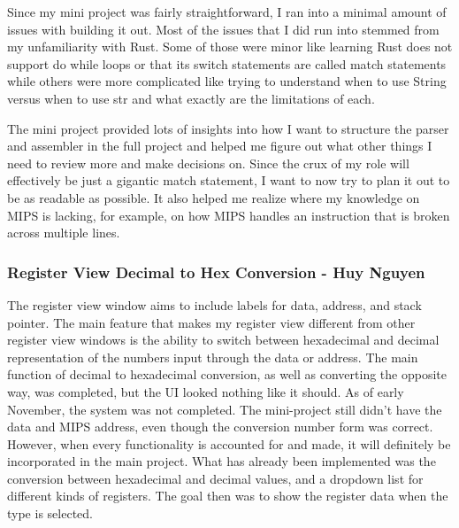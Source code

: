 \documentclass[
    paper=letter,
    parskip=half,
    fontsize=12pt,
    titlepage=firstiscover,
    toc=bibliography,
    numbers=endperiod
]{scrartcl}
\begin{document}
Since my mini project was fairly straightforward, I ran into a minimal
amount of issues with building it out. Most of the issues that I did run
into stemmed from my unfamiliarity with Rust. Some of those were minor
like learning Rust does not support do while loops or that its switch
statements are called match statements while others were more
complicated like trying to understand when to use String versus when to
use str and what exactly are the limitations of each.

The mini project provided lots of insights into how I want to structure
the parser and assembler in the full project and helped me figure out
what other things I need to review more and make decisions on. Since the
crux of my role will effectively be just a gigantic match statement, I
want to now try to plan it out to be as readable as possible. It also
helped me realize where my knowledge on MIPS is lacking, for example, on
how MIPS handles an instruction that is broken across multiple lines.

\subsubsection{Register View Decimal to Hex Conversion - Huy Nguyen}

The register view window aims to include labels for data, address, and
stack pointer. The main feature that makes my register view different
from other register view windows is the ability to switch between
hexadecimal and decimal representation of the numbers input through the
data or address. The main function of decimal to hexadecimal conversion,
as well as converting the opposite way, was completed, but the UI looked
nothing like it should. As of early November, the system was not
completed. The mini-project still didn't have the data and MIPS address,
even though the conversion number form was correct. However, when every
functionality is accounted for and made, it will definitely be
incorporated in the main project. What has already been implemented was
the conversion between hexadecimal and decimal values, and a dropdown
list for different kinds of registers. The goal then was to show the
register data when the type is selected.
\end{document}
